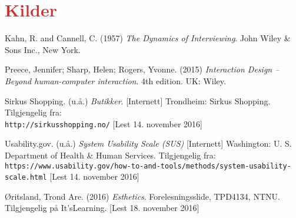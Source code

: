 \section{\textcolor[HTML]{D32F2F}{Kilder}}
\begin{thebibliography}{10}
Kahn, R. and Cannell, C. (1957) \textit{The Dynamics of Interviewing}. John Wiley \& Sons Inc., New York.

Preece, Jennifer; Sharp, Helen; Rogers, Yvonne. (2015) \textit{Interaction Design – Beyond human-computer interaction}. 4th edition. UK: Wiley.

Sirkus Shopping. (u.å.) \textit{Butikker}. [Internett] Trondheim: Sirkus Shopping. Tilgjengelig fra: \\\texttt{http://sirkusshopping.no/} [Lest 14. november 2016]

Usability.gov. (u.å.) \textit{System Usability Scale (SUS)} [Internett] Washington: U. S. Department of Health \& Human Services. Tilgjengelig fra:\\ \texttt{https://www.usability.gov/how-to-and-tools/methods/system-usability-scale.html} [Lest 14. november 2016]

Øritsland, Trond Are. (2016) \textit{Esthetics}. Forelesningsslide, TPD4134, NTNU. Tilgjengelig på It’sLearning. [Lest 18. november 2016]

\end{thebibliography}